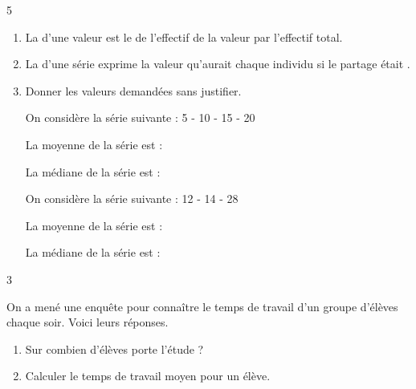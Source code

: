 \documentclass[a4paper]{book}
\begin{document}
{\begin{exerciceNote}{5}
\begin{enumerate}
            \medskip

            \item La \points[5] d'une valeur est le \points[5] de l'effectif de la valeur par l'effectif total.

            \medskip

            \item La \points[5] d'une série exprime la valeur qu'aurait chaque individu si le partage était \points[5].

            \medskip


            \item Donner les valeurs demandées sans justifier. 

            \begin{minipage}{0.45\linewidth}
                On considère la série suivante : 5 - 10 - 15 - 20

                La moyenne de la série est : \points[5]

                La médiane de la série est : \points[5]
            \end{minipage}
            \hfill
            \vline
            \hfill
            \begin{minipage}{0.45\linewidth}
                On considère la série suivante : 12 - 14 - 28
                
                La moyenne de la série est : \points[5]

                La médiane de la série est : \points[5]
            \end{minipage}
        \end{enumerate}
    \end{exerciceNote}


    \begin{exerciceNote}{3}
        \begin{minipage}{0.5\linewidth}
            On a mené une enquête pour connaître le temps de travail d'un groupe d'élèves chaque soir. Voici leurs réponses.

            \begin{enumerate}
                \item Sur combien d'élèves porte l'étude ? \points[5]
                \item Calculer le temps de travail moyen pour un élève.
                
                \points[18] \\ \points[18] \\ \points[18] \\\points[18] \\ \points[18] \\ \points[18]
            \end{enumerate}
            

\end{minipage}
\end{exerciceNote}}
\end{document}
